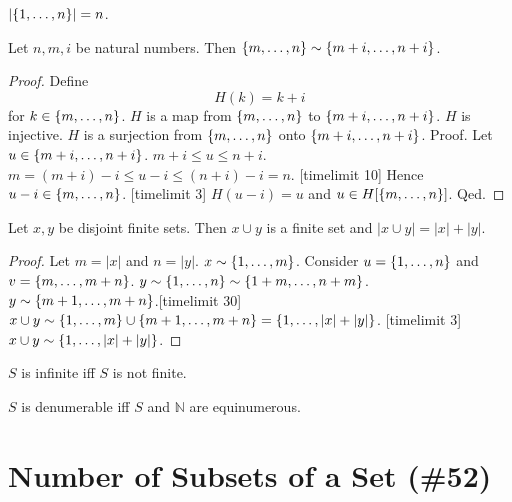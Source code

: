 \documentclass{article}
\begin{document}
\begin{forthel}
  \begin{lemma}
  $|\{1,\dots,n\}| = n$.
  \end{lemma}

  \begin{lemma}
  Let $n,m,i$ be natural numbers.
  Then $\{m,\dots,n\} \sim \{m+i,\dots,n+i\}$.
  \end{lemma}
  \begin{proof}
  Define \[ H(k) = k + i \]
          for $k \in \{m,\dots,n\}$.
  $H$ is a map from $\{m,\dots,n\}$ to $\{m+i,\dots,n+i\}$.
  $H$ is injective.
  $H$ is a surjection from $\{m,\dots,n\}$ onto $\{m+i,\dots,n+i\}$.
  Proof.
  Let $u \in \{m+i,\dots,n+i\}$. $m + i \leq u \leq n + i$.
  $m  = (m + i) - i \leq u - i \leq (n + i) - i = n$.
[timelimit 10]
  Hence $u - i \in \{m,\dots,n\}$.
[timelimit 3] $H(u-i) = u$ and
  $u \in H[\{m,\dots,n\}]$.
  Qed.
  \end{proof}

  \begin{lemma}
  Let $x,y$ be disjoint finite sets.
  Then $x \cup y$ is a finite set and $|x \cup y| = |x| + |y|$.
  \end{lemma}
  \begin{proof}
  Let $m = |x|$ and $n = |y|$.
  $x \sim \{1,\dots,m\}$.
  Consider $u = \{1,\dots,n\}$ and $v = \{m,\dots,m+n\}$.
  $y \sim \{1,\dots,n\} \sim \{1+m,\dots,n+m\}$.
  $y \sim \{m+1,\dots,m+n\}$.[timelimit 30]
  $x \cup y \sim \{1,\dots,m\} \cup \{m+1,\dots,m+n\} = \{1,\dots,|x|+|y|\}$. [timelimit 3]
  $x \cup y \sim \{1,\dots,|x|+|y|\}$.
  \end{proof}


  \begin{definition}
  $S$ is infinite iff $S$ is not finite.
  \end{definition}

  \begin{definition}
  $S$ is denumerable iff $S$ and $\mathbb{N}$ are equinumerous.
  \end{definition}
  \end{forthel}


  \section{Number of Subsets of a Set (\#52)}
\end{document}
